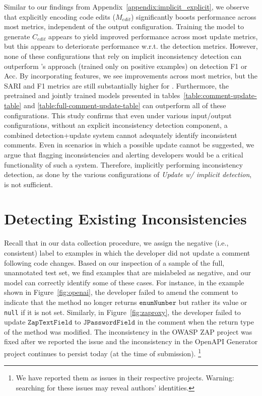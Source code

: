 \documentclass[letterpaper]{article} %
\newcommand{\CodeIn}[1]{{\ifmmode{\mathtt{#1}}\else$\mathtt{#1}$\fi}}
\newcommand{\EditComment}{$C_{edit}$}
\newcommand{\EditCode}{$M_{edit}$}
\newcommand{\UpdateCopy}{Update w/ implicit detection}
\begin{document}
 
Similar to our findings from Appendix~\ref{appendix:implicit_explicit}, we observe that explicitly encoding code edits (\EditCode{}) significantly boosts performance across most metrics, independent of the output configuration. Training the model to generate \EditComment{} appears to yield improved performance across most update metrics, but this appears to deteriorate performance w.r.t. the detection metrics. However, none of these configurations that rely on implicit inconsistency detection can outperform \citet{panthaplackel2020update}'s approach (trained only on positive examples) on detection F1 or Acc. By incorporating features, we see improvements across most metrics, but the SARI and F1 metrics are still substantially higher for \citet{panthaplackel2020update}. Furthermore, the pretrained and jointly trained models presented in tables~\ref{table:comment-update-table} and \ref{table:full-comment-update-table} can outperform all of these configurations. This study confirms that even under various input/output configurations, without an explicit inconsistency detection component, a combined detection+update system cannot adequately identify inconsistent comments. Even in scenarios in which a possible update cannot be suggested, we argue that flagging inconsistencies and alerting developers would be a critical functionality of such a system. Therefore, implicitly performing inconsistency detection, as done by the various configurations of \textit{\UpdateCopy{}}, is not sufficient.
 
\section{Detecting Existing Inconsistencies}
 Recall that in our data collection procedure, we assign the negative (i.e., consistent) label to examples in which the developer did not update a comment following code changes. Based on our inspection of a sample of the full, unannotated test set, we find examples that are mislabeled as negative, and our model can correctly identify some of these cases. For instance, in the example shown in Figure~\ref{fig:openai}, the developer failed to amend the comment to indicate that the method no longer returns \CodeIn{enumNumber} but rather its value or \texttt{null} if it is not set. Similarly, in Figure~\ref{fig:zaproxy},  the developer failed to update \CodeIn{ZapTextField} to \CodeIn{JPasswordField} in the comment when the return type of the method was modified. The inconsistency in the OWASP ZAP project was fixed after we reported the issue and the inconsistency in the OpenAPI Generator project continues to persist today (at the time of submission). \footnote{We have reported them as issues in their respective projects. Warning: searching for these issues may reveal authors' identities.}
 
\end{document}
